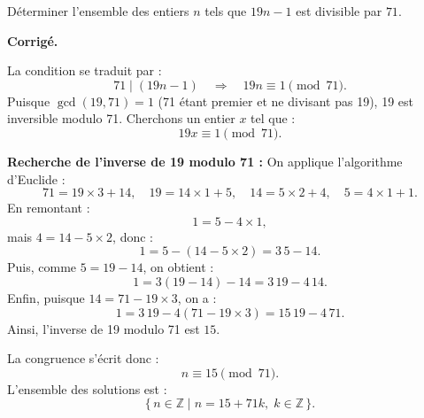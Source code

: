 \documentclass[a4paper,11pt]{article}
\newenvironment{corrige}[1][Corrigé]{%
  \par\noindent\textbf{#1.}%
  \begin{itshape}}%
  {\end{itshape}\par}
\begin{document}
    \begin{exercice}[title=Exercice 25 $\quad \star\star \quad$ { [Calculer, Raisonner] }]{}{}
    Déterminer l'ensemble des entiers $n$ tels que $19n-1$ est divisible par $71$.
    \end{exercice}
    
    \begin{corrige}
    La condition se traduit par :
    \[
    71 \mid (19n-1) \quad \Longrightarrow \quad 19n \equiv 1 \pmod{71}.
    \]
    Puisque $\gcd(19,71)=1$ (71 étant premier et ne divisant pas 19), 19 est inversible modulo 71. Cherchons un entier $x$ tel que :
    \[
    19x \equiv 1 \pmod{71}.
    \]
    \medskip
    
    \textbf{Recherche de l'inverse de 19 modulo 71 :}  
    On applique l'algorithme d'Euclide :
    \[
    71 = 19 \times 3 + 14,\quad 19 = 14 \times 1 + 5,\quad 14 = 5 \times 2 + 4,\quad 5 = 4 \times 1 + 1.
    \]
    En remontant :
    \[
    1 = 5 - 4 \times 1,
    \]
    mais $4 = 14 - 5 \times 2$, donc :
    \[
    1 = 5 - (14 - 5 \times 2) = 3\,5 - 14.
    \]
    Puis, comme $5 = 19 - 14$, on obtient :
    \[
    1 = 3(19 - 14) - 14 = 3\,19 - 4\,14.
    \]
    Enfin, puisque $14 = 71 - 19 \times 3$, on a :
    \[
    1 = 3\,19 - 4(71 - 19 \times 3) = 15\,19 - 4\,71.
    \]
    Ainsi, l'inverse de 19 modulo 71 est $15$.
    \medskip
    
    La congruence s'écrit donc :
    \[
    n \equiv 15 \pmod{71}.
    \]
    L'ensemble des solutions est :
    \[
    \{\,n\in \mathbb{Z} \mid n = 15 + 71k,\; k\in \mathbb{Z}\,\}.
    \]
    \end{corrige}
    
    
\end{document}
